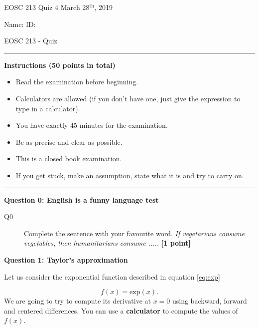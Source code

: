\documentclass{article}
\begin{document}
\pagestyle{empty}

\large{EOSC 213 Quiz 4} \hspace{10cm} \large{March 28$^{\textrm{th}}$, 2019}

\large{Name:} \hspace{12cm} \large{ID: }
\begin{center}
\Huge{EOSC 213 - Quiz}
\end{center}

\rule{\textwidth}{1pt}

\large{\textbf{Instructions (50 points in total)}}
\begin{multicols}{2}
\begin{itemize}
\item Read the examination before beginning.
\item Calculators are allowed (if you don't have one, just give the expression to type in a calculator).
\item You have exactly 45 minutes for the examination.
\item Be as precise and clear as possible.
\item This is a closed book examination.
\item If you get stuck, make an assumption, state what it is and try to carry on.
\end{itemize} 
\end{multicols}



\rule{\textwidth}{1pt}

\textbf{Question 0: English is a funny language test}

\begin{description}
\item [Q0] Complete the sentence with your favourite word. \textit{If vegetarians consume vegetables, then humanitarians consume .....}  \textbf{[1 point]}
\vspace{0.5cm}

\end{description}

\textbf{Question 1: Taylor's approximation}

Let us consider the exponential function described in equation \ref{eq:exp}

\begin{equation}
f(x) = \mathrm{exp}(x). \label{eq:exp}
\end{equation} We are going to try to compute its derivative at $x = 0$ using backward, forward and centered differences. You can use a \textbf{calculator} to compute the values of $f(x)$.
\end{document}
